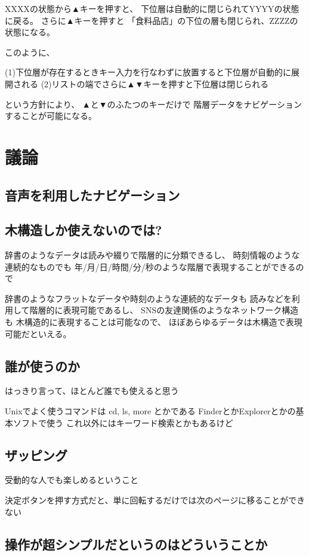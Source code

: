 \documentclass[twoside]{wiss}
\begin{document}
XXXXの状態から▲キーを押すと、
下位層は自動的に閉じられてYYYYの状態に戻る。 
さらに▲キーを押すと
「食料品店」の下位の層も閉じられ、ZZZZの状態になる。

このように、

(1)下位層が存在するときキー入力を行なわずに放置すると下位層が自動的に展開される
(2)リストの端でさらに▲▼キーを押すと下位層は閉じられる

という方針により、
▲と▼のふたつのキーだけで
階層データをナビゲーションすることが可能になる。


\section{議論}

\subsection*{音声を利用したナビゲーション}

\subsection*{木構造しか使えないのでは?}

辞書のようなデータは読みや綴りで階層的に分類できるし、
時刻情報のような連続的なものでも
年/月/日/時間/分/秒のような階層で表現することができるので

辞書のようなフラットなデータや時刻のような連続的なデータも
読みなどを利用して階層的に表現可能であるし、
SNSの友達関係のようなネットワーク構造も
木構造的に表現することは可能なので、
ほぼあらゆるデータは木構造で表現可能だといえる。

\subsection*{誰が使うのか}

  はっきり言って、ほとんど誰でも使えると思う

  Unixでよく使うコマンドは cd, ls, more とかである
  FinderとかExplorerとかの基本ソフトで使う
  これ以外にはキーワード検索とかもあるけど

\subsection*{ザッピング}
   受動的な人でも楽しめるということ

  決定ボタンを押す方式だと、単に回転するだけでは次のページに移ることができない

\subsection*{操作が超シンプルだというのはどういうことか}
\end{document}

